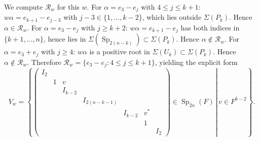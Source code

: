 \documentclass[11pt,notitlepage]{amsart}
\theoremstyle{definition}
\theoremstyle{remark}
\newcommand{\calR}{\mathcal{R}}
\DeclareMathOperator{\Sp}{Sp}
\begin{document}
We compute $\calR_w$ for this $w$. For $\alpha = e_3 - e_j$ with $4 \leq j \leq k+1$: $w \alpha = e_{k+1} - e_{j-3}$ with $j - 3 \in \{1, \ldots, k-2\}$, which lies outside $\Sigma(P_k)$. Hence $\alpha \in \calR_w$. For $\alpha = e_3 - e_j$ with $j \geq k+2$: $w \alpha = e_{k+1} - e_j$ has both indices in $\{k+1, \ldots, n\}$, hence lies in $\Sigma(\Sp_{2(n-k)}) \subset \Sigma(P_k)$. Hence $\alpha \notin \calR_w$. For $\alpha = e_3 + e_j$ with $j \geq 4$: $w \alpha$ is a positive root in $\Sigma(U_k) \subset \Sigma(P_k)$. Hence $\alpha \notin \calR_w$. Therefore $\calR_w = \{e_3 - e_j : 4 \leq j \leq k+1\}$, yielding the explicit form
\begin{equation}\label{choicesofv}
    V_w = \left\{\left.\begin{pmatrix}
        I_2 & & & & & & \\
        & 1 & v & & & & \\
        & & I_{k-2} & & & & \\
        & & & I_{2(n-k-1)} & & & \\
        & & & & I_{k-2} & v^* & \\
        & & & & & 1 & \\
        & & & & & & I_2
    \end{pmatrix} \in \Sp_{2n}(F) \,\right|\, v \in F^{k-2}\right\}.
\end{equation}
\end{document}
